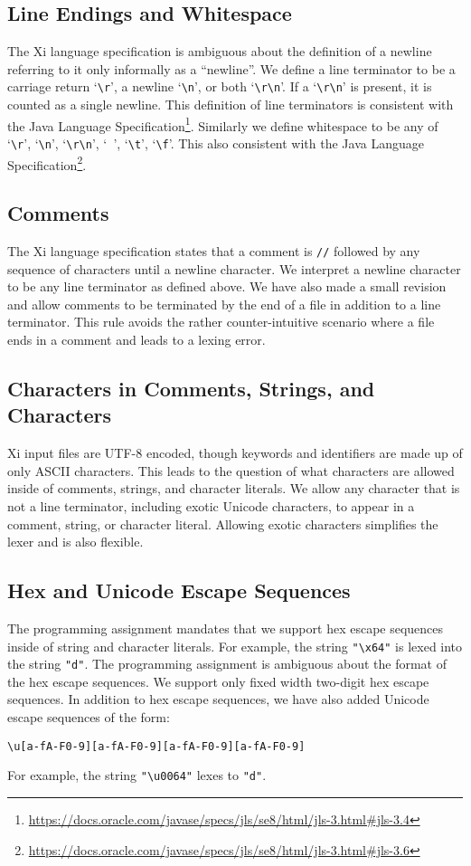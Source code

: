 \documentclass{hw}
\begin{document}
\subsection{Line Endings and Whitespace}
The Xi language specification is ambiguous about the definition of a newline
referring to it only informally as a ``newline''. We define a line terminator
to be a carriage return `\verb$\r$', a newline `\verb$\n$', or both
`\verb$\r\n$'. If a `\verb$\r\n$' is present, it is counted as a single
newline. This definition of line terminators is consistent with the Java
Language
Specification\footnote{\url{https://docs.oracle.com/javase/specs/jls/se8/html/jls-3.html\#jls-3.4}}.
Similarly we define whitespace to be any of `\verb$\r$', `\verb$\n$',
`\verb$\r\n$', `\verb$ $', `\verb$\t$', `\verb$\f$'. This also consistent with
the Java Language
Specification\footnote{\url{https://docs.oracle.com/javase/specs/jls/se8/html/jls-3.html\#jls-3.6}}.

\subsection{Comments}
The Xi language specification states that a comment is \texttt{//} followed by
any sequence of characters until a newline character. We interpret a newline
character to be any line terminator as defined above. We have also made a small
revision and allow comments to be terminated by the end of a file in addition
to a line terminator. This rule avoids the rather counter-intuitive scenario
where a file ends in a comment and leads to a lexing error.

\subsection{Characters in Comments, Strings, and Characters}
Xi input files are UTF-8 encoded, though keywords and identifiers are made up
of only ASCII characters. This leads to the question of what characters are
allowed inside of comments, strings, and character literals. We allow any
character that is not a line terminator, including exotic Unicode characters,
to appear in a comment, string, or character literal. Allowing exotic
characters simplifies the lexer and is also flexible.

\subsection{Hex and Unicode Escape Sequences}
The programming assignment mandates that we support hex escape sequences inside
of string and character literals. For example, the string \verb$"\x64"$ is
lexed into the string \texttt{"d"}. The programming assignment is ambiguous
about the format of the hex escape sequences. We support only fixed width
two-digit hex escape sequences.
%
In addition to hex escape sequences, we have also added Unicode escape
sequences of the form:
\begin{center}
  \verb$\u[a-fA-F0-9][a-fA-F0-9][a-fA-F0-9][a-fA-F0-9]$
\end{center}
For example, the string \verb$"\u0064"$ lexes to \texttt{"d"}.
\end{document}
